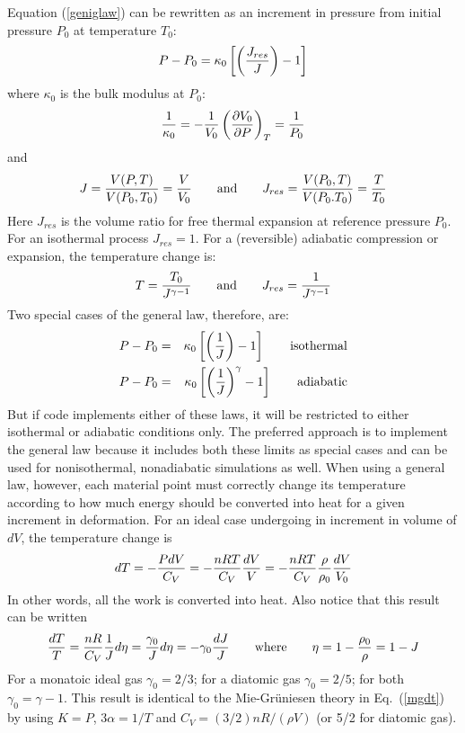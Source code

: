 \documentclass[11pt]{book}
\begin{document}
Equation (\ref{geniglaw}) can be rewritten as an increment in pressure from initial pressure $P_0$ at temperature $T_0$:
\begin{equation}
    P - P_0 = \kappa_0\left[\left(J_{res}\over J\right)-1\right]
\end{equation}
where $\kappa_0$ is the bulk modulus at $P_0$:
\begin{equation}
   {1\over \kappa_0} = -{1\over V_0} \left({\partial V_0\over \partial P}\right)_T = {1\over P_0}
\end{equation}
and
\begin{equation}
    J = {V(P,T)\over V(P_0,T_0)}={V\over V_0} \qquad{\rm and}\qquad J_{res} = {V(P_0,T)\over V(P_0.T_0)} = {T\over T_0}
\end{equation}
Here $J_{res}$ is the volume ratio for free thermal expansion at reference pressure $P_0$. For an isothermal process $J_{res}=1$. For a (reversible) adiabatic compression or expansion, the temperature change is:
\begin{equation}
       T = {T_0\over J^{\gamma-1}} \qquad{\rm and}\qquad J_{res} = {1\over J^{\gamma-1}}
\end{equation}
Two special cases of the general law, therefore, are:
\begin{eqnarray}
   P - P_0 & = & \kappa_0\left[\left(1\over J\right)-1\right]  \qquad{\rm isothermal} \\
   P - P_0 & = & \kappa_0\left[\left(1\over J\right)^\gamma-1\right]  \qquad{\rm adiabatic}
\end{eqnarray}
But if code implements either of these laws, it will be restricted to either isothermal or adiabatic conditions only. The preferred approach is to implement the general law because it includes both these limits as special cases and can be used for nonisothermal, nonadiabatic simulations as well. When using a general law, however, each  material point must correctly change its temperature according to how much energy should be converted into heat for a given increment in deformation. For an ideal case undergoing in increment in volume of $dV$, the temperature change is
\begin{equation}
    dT = -{P dV\over C_V} = -{nRT \over C_V}{dV \over V} = -{nRT \over C_V}{\rho\over\rho_0}{dV \over V_0}
\end{equation}
In other words, all the work is converted into heat. Also notice that this result can be written
\begin{equation}
    {dT\over T} = {nR \over C_V}{1\over J}d\eta = {\gamma_0\over J}d\eta = -\gamma_0{dJ\over J} \qquad{\rm where}\qquad \eta = 1 - {\rho_0\over \rho} = 1 - J
\end{equation}
For a monatoic ideal gas $\gamma_0=2/3$; for a diatomic gas $\gamma_0=2/5$; for both $\gamma_0=\gamma-1$. This result is identical to the Mie-Gr\"{u}niesen theory in Eq.~(\ref{mgdt}) by using $K=P$, $3\alpha=1/T$ and $C_V = (3/2)nR/(\rho V)$ (or 5/2 for diatomic gas).
\end{document}
